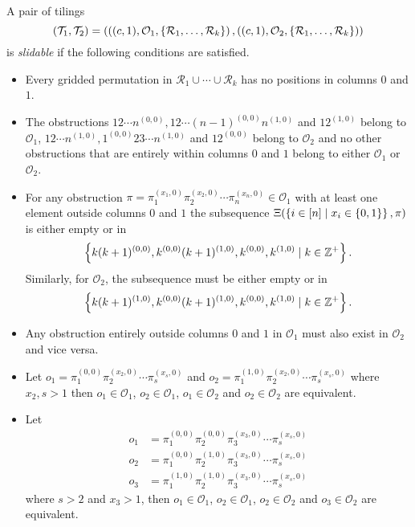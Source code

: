 \begin{definition}\label{def:slidable}
A pair of tilings
\[
    (\mathcal{T}_1,\mathcal{T}_2) = \left(\left((c,1), \mathcal{O}_1, \left\{\mathcal{R}_1,\ldots,\mathcal{R}_k\right\}\right), \left((c,1), \mathcal{O}_2, \left\{\mathcal{R}_1,\ldots,\mathcal{R}_k\right\}\right)\right)
\]
is \emph{slidable} if the following conditions are satisfied.
\begin{itemize}
    \item Every gridded permutation in $\mathcal{R}_1 \cup \cdots \cup \mathcal{R}_k$ has no positions in columns $0$ and $1$.
    \item The obstructions $12\cdots n^{(0,0)}, 12\cdots (n-1)^{(0,0)}n^{(1,0)}$ and $12^{(1,0)}$ belong to $\mathcal{O}_1$, $12\cdots n^{(1,0)}, 1^{(0,0)}23\cdots n^{(1,0)}$ and $12^{(0,0)}$ belong to $\mathcal{O}_2$ and no other obstructions that are entirely within columns $0$ and $1$ belong to either $\mathcal{O}_1$ or $\mathcal{O}_2$.
    \item For any obstruction $\pi = \pi_1^{(x_1,0)}\pi_2^{(x_2,0)}\cdots\pi_n^{(x_n,0)} \in \mathcal{O}_1$ with at least one element outside columns $0$ and $1$ the subsequence $\Xi(\left\{i \in [n] \mid x_i \in \left\{0,1\right\}\right\},\pi)$ is either empty or in 
    \[
         \left\{k(k+1)^{(0,0)}, k^{(0,0)}(k+1)^{(1,0)}, k^{(0,0)},k^{(1,0)} \mid k\in\mathbb{Z}^+\right\}.
    \]
    Similarly, for $\mathcal{O}_2$, the subsequence must be either empty or in 
    \[
         \left\{k(k+1)^{(1,0)}, k^{(0,0)}(k+1)^{(1,0)}, k^{(0,0)},k^{(1,0)} \mid k\in\mathbb{Z}^+\right\}.
    \]
    \item Any obstruction entirely outside columns $0$ and $1$ in $\mathcal{O}_1$ must also exist in $\mathcal{O}_2$ and vice versa.
    \item Let $o_1 = \pi_1^{(0,0)}\pi_2^{(x_2,0)}\cdots\pi_s^{(x_s,0)}$ and $o_2 = \pi_1^{(1,0)}\pi_2^{(x_2,0)}\cdots\pi_s^{(x_s,0)}$ where $x_2,s > 1$ then $o_1 \in \mathcal{O}_1$, $o_2 \in \mathcal{O}_1$, $o_1 \in \mathcal{O}_2$ and $o_2 \in \mathcal{O}_2$ are equivalent.
    \item Let \begin{align*}o_1 &= \pi_1^{(0,0)}\pi_2^{(0,0)}\pi_3^{(x_3,0)}\cdots\pi_s^{(x_s,0)}\\o_2 &= \pi_1^{(0,0)}\pi_2^{(1,0)}\pi_3^{(x_3,0)}\cdots\pi_s^{(x_s,0)}\\o_3 &= \pi_1^{(1,0)}\pi_2^{(1,0)}\pi_3^{(x_3,0)}\cdots\pi_s^{(x_s,0)}\end{align*} where $s > 2$ and $x_3 > 1$, then $o_1 \in \mathcal{O}_1$, $o_2 \in \mathcal{O}_1$, $o_2 \in \mathcal{O}_2$ and $o_3 \in \mathcal{O}_2$ are equivalent.
\end{itemize}
\end{definition}

